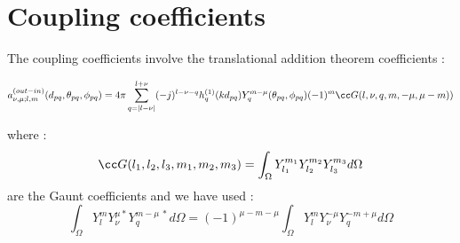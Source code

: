 \appendix
\section{Coupling coefficients}

The coupling coefficients involve the translational addition theorem
coefficients :
%
\begin{widetext}
\begin{equation*}
  a_{\nu,\mu;l,m}^{(out-in)}(d_{pq},\theta_{pq},\phi_{pq})
    = 4\pi\sum_{q=|l-\nu|}^{l+\nu}
       (-j)^{l-\nu-q}h_q^{(1)}(kd_{pq}) Y_q^{m-\mu}(\theta_{pq},\phi_{pq})
       (-1)^m \cc G(l,\nu,q, m,-\mu,\mu-m))
\end{equation*}
\end{widetext}
%
where :
%
\begin{equation*}
  \cc G(l_1,l_2,l_3,m_1,m_2,m_3) =
  \int_{\Omega}Y_{l_1}^{m_1}Y_{l_2}^{m_2}Y_{l_3}^{m_3}d\Omega
\end{equation*}
%
are the Gaunt coefficients
and we have used :
%
\begin{equation*}
  \int_{\Omega}Y_{l}^{m}Y_{\nu}^{\mu*}Y_{q}^{m-\mu~*}d\Omega =
(-1)^{\mu-m-\mu}\int_{\Omega}Y_{l}^{m}Y_{\nu}^{-\mu}Y_{q}^{-m+\mu}d\Omega
\end{equation*}
